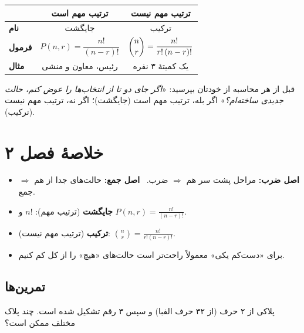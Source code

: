 \begin{center}
\renewcommand{\arraystretch}{1.5}
\begin{tabular}{l|c|c}
 & \textbf{ترتیب مهم است} & \textbf{ترتیب مهم نیست}\\\hline
\textbf{نام} & جایگشت & ترکیب\\
\textbf{فرمول} & $P(n,r)=\dfrac{n!}{(n-r)!}$ & $\dbinom nr=\dfrac{n!}{r!\,(n-r)!}$\\
\textbf{مثال} & رئیس، معاون و منشی & یک کمیتهٔ ۳ نفره\\
\end{tabular}
\end{center}

\begin{warning}
قبل از هر محاسبه از خودتان بپرسید: «\emph{اگر جای دو تا از انتخاب‌ها را عوض کنم، حالت جدیدی ساخته‌ام؟}» اگر بله، ترتیب مهم است (جایگشت)؛ اگر نه، ترتیب مهم نیست (ترکیب).
\end{warning}

\section*{خلاصهٔ فصل ۲}

\begin{summary}[title={\leavevmode\boxicon{accent}{$\Sigma$}\ \ خلاصهٔ فصل}]
\begin{itemize}
  \item \textbf{اصل ضرب:} مراحل پشت سر هم $\Rightarrow$ ضرب. \ \textbf{اصل جمع:} حالت‌های جدا از هم $\Rightarrow$ جمع.
  \item \textbf{جایگشت} (ترتیب مهم): $n!$ و $P(n,r)=\frac{n!}{(n-r)!}$.
  \item \textbf{ترکیب} (ترتیب مهم نیست): $\binom nr=\frac{n!}{r!(n-r)!}$.
  \item برای «دست‌کم یکی» معمولاً راحت‌تر است حالت‌های «هیچ» را از کل کم کنیم.
\end{itemize}
\end{summary}

\subsection*{تمرین‌ها}

\begin{exercise}
پلاکی از ۲ حرف (از ۳۲ حرف الفبا) و سپس ۳ رقم تشکیل شده است. چند پلاک مختلف ممکن است؟
\end{exercise}

